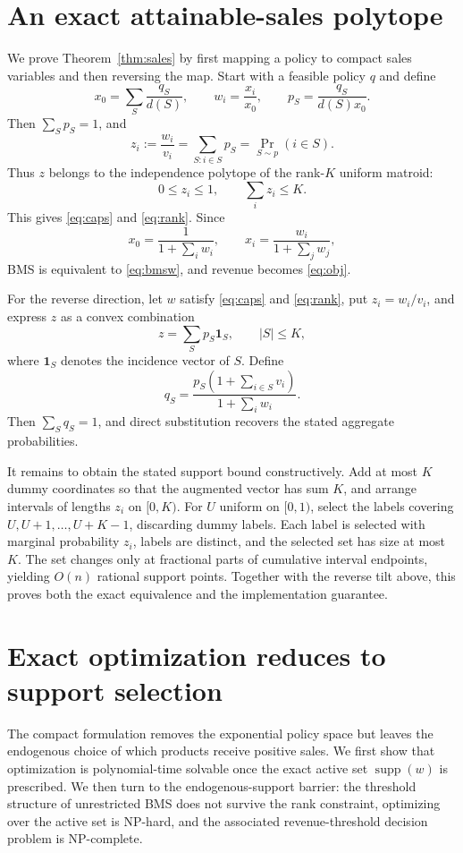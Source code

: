 \documentclass[11pt]{article}
\newcommand{\supp}{\operatorname{supp}}
\begin{document}
\section{An exact attainable-sales polytope}\label{sec:sales}
We prove Theorem~\ref{thm:sales} by first mapping a policy to compact sales variables and then reversing the map. Start with a feasible policy $q$ and define
\[
 x_0=\sum_S\frac{q_S}{d(S)},\qquad w_i=\frac{x_i}{x_0},\qquad p_S=\frac{q_S}{d(S)x_0}.
\]
Then $\sum_Sp_S=1$, and
\[
 z_i:=\frac{w_i}{v_i}=\sum_{S:i\in S}p_S=\Pr_{S\sim p}(i\in S).
\]
Thus $z$ belongs to the independence polytope of the rank-$K$ uniform matroid:
\[
 0\le z_i\le1,\qquad \sum_i z_i\le K.
\]
This gives \eqref{eq:caps} and \eqref{eq:rank}. Since
\[
 x_0=\frac1{1+\sum_iw_i},\qquad x_i=\frac{w_i}{1+\sum_jw_j},
\]
BMS is equivalent to \eqref{eq:bmsw}, and revenue becomes \eqref{eq:obj}.

For the reverse direction, let $w$ satisfy \eqref{eq:caps} and \eqref{eq:rank}, put $z_i=w_i/v_i$, and express $z$ as a convex combination
\[
 z=\sum_Sp_S\mathbf 1_S,\qquad |S|\le K,
\]
where $\mathbf 1_S$ denotes the incidence vector of $S$.
Define
\[
 q_S=\frac{p_S(1+\sum_{i\in S}v_i)}{1+\sum_iw_i}.
\]
Then $\sum_Sq_S=1$, and direct substitution recovers the stated aggregate probabilities.

It remains to obtain the stated support bound constructively. Add at most $K$ dummy coordinates so that the augmented vector has sum $K$, and arrange intervals of lengths $z_i$ on $[0,K)$. For $U$ uniform on $[0,1)$, select the labels covering $U,U+1,\ldots,U+K-1$, discarding dummy labels. Each label is selected with marginal probability $z_i$, labels are distinct, and the selected set has size at most $K$. The set changes only at fractional parts of cumulative interval endpoints, yielding $O(n)$ rational support points. Together with the reverse tilt above, this proves both the exact equivalence and the implementation guarantee.


\section{Exact optimization reduces to support selection}\label{sec:exact}
The compact formulation removes the exponential policy space but leaves the endogenous choice of which products receive positive sales. We first show that optimization is polynomial-time solvable once the exact active set $\supp(w)$ is prescribed. We then turn to the endogenous-support barrier: the threshold structure of unrestricted BMS does not survive the rank constraint, optimizing over the active set is NP-hard, and the associated revenue-threshold decision problem is NP-complete.
\end{document}
